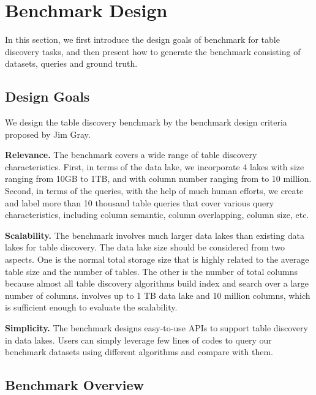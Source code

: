 \section{Benchmark Design} 
In this section, we first introduce the design goals of \sys benchmark for table discovery tasks, and then present how to generate the \sys benchmark consisting of datasets, queries and ground truth.

\subsection{Design Goals}
We design the table discovery benchmark by the 
benchmark design criteria proposed by Jim Gray.

\noindent\textbf{Relevance.}
The benchmark covers a wide range of table discovery characteristics. First, in terms of the data lake, we incorporate 4 lakes with size ranging from 10GB to 1TB, and with column number ranging from  to 10 million. Second, in terms of the queries, with the help of much human efforts, we create and label more than 10 thousand table queries that cover various query characteristics, including column semantic, column overlapping, column size, etc.



\noindent\textbf{Scalability.} The benchmark involves much larger data lakes than existing data lakes for table discovery. The data lake size should be considered from two aspects. One is the normal total storage size that is highly related  to the average table size  and the number of tables. The other is the number of total columns because almost all table discovery algorithms build index and search over a large number of columns.  \sys involves up to 1 TB data lake and 10 million columns, which is sufficient enough to evaluate the scalability.




\noindent\textbf{Simplicity.} The benchmark designs easy-to-use APIs to support table discovery in data lakes. Users can simply leverage few lines of codes to query our benchmark datasets using different algorithms and compare with them.









\subsection{Benchmark Overview}


